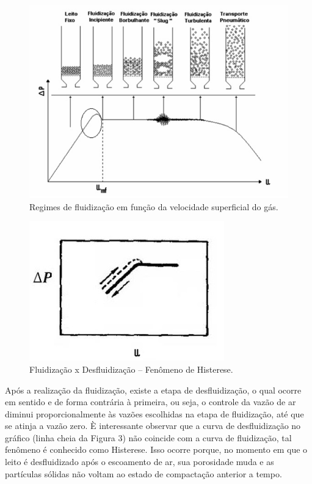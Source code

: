 \begin{figure}[H]
	\begin{center}
		\includegraphics[scale=.8, trim={0 0 0 0}]{figuras/ladeq/fluid/fig2}
		\caption{Regimes de fluidização em função da velocidade superficial do gás.}
		\label{fig2}
	\end{center}
\end{figure}

\begin{figure}[H]
	\begin{center}
		\includegraphics[scale=.8, trim={0 0 0 0}]{figuras/ladeq/fluid/fig3}
		\caption{Fluidização x Desfluidização – Fenômeno de Histerese.}
		\label{fig3}
	\end{center}
\end{figure}


Após a realização da fluidização, existe a etapa de desfluidização, o qual ocorre em sentido e de forma contrária à primeira, ou seja, o controle da vazão de ar diminui proporcionalmente às vazões escolhidas na etapa de fluidização, até que se atinja a vazão zero. È interessante observar que a curva de desfluidização no gráfico (linha cheia da Figura 3) não coincide com a curva de fluidização, tal fenômeno é conhecido como Histerese. Isso ocorre porque, no momento em que o leito é desfluidizado após o escoamento de ar, sua porosidade muda e as partículas sólidas não voltam ao estado de compactação anterior a tempo.

